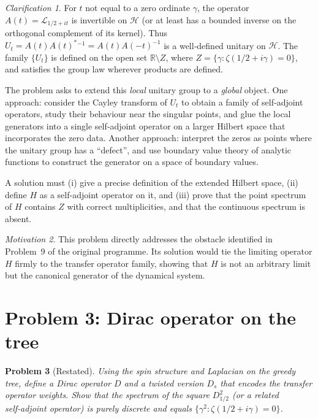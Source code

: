 \documentclass[11pt,a4paper]{article}
\newtheorem{problem}{Problem}[section]
\theoremstyle{remark}
\newtheorem{clarification}[problem]{Clarification}
\newtheorem{motivation}[problem]{Motivation}
\newcommand{\cL}{\mathcal{L}}
\newcommand{\cH}{\mathcal{H}}
\newcommand{\bbR}{\mathbb{R}}
\begin{document}
\begin{clarification}
For $t$ not equal to a zero ordinate $\gamma$, the operator $A(t)=\cL_{1/2+it}$ is invertible on $\cH$ (or at least has a bounded inverse on the orthogonal complement of its kernel). Thus $U_t = A(t)A(t)^*{}^{-1} = A(t)A(-t)^{-1}$ is a well‑defined unitary on $\cH$. The family $\{U_t\}$ is defined on the open set $\bbR\setminus Z$, where $Z=\{\gamma:\zeta(1/2+i\gamma)=0\}$, and satisfies the group law wherever products are defined.

The problem asks to extend this \emph{local} unitary group to a \emph{global} object. One approach: consider the Cayley transform of $U_t$ to obtain a family of self‑adjoint operators, study their behaviour near the singular points, and glue the local generators into a single self‑adjoint operator on a larger Hilbert space that incorporates the zero data. Another approach: interpret the zeros as points where the unitary group has a ``defect'', and use boundary value theory of analytic functions to construct the generator on a space of boundary values.

A solution must (i) give a precise definition of the extended Hilbert space, (ii) define $H$ as a self‑adjoint operator on it, and (iii) prove that the point spectrum of $H$ contains $Z$ with correct multiplicities, and that the continuous spectrum is absent.
\end{clarification}

\begin{motivation}
This problem directly addresses the obstacle identified in Problem~9 of the original programme. Its solution would tie the limiting operator $H$ firmly to the transfer operator family, showing that $H$ is not an arbitrary limit but the canonical generator of the dynamical system.
\end{motivation}

\section{Problem 3: Dirac operator on the tree}

\begin{problem}[Restated]
Using the spin structure and Laplacian on the greedy tree, define a Dirac operator $D$ and a twisted version $D_s$ that encodes the transfer operator weights. Show that the spectrum of the square $D_{1/2}^2$ (or a related self‑adjoint operator) is purely discrete and equals $\{\gamma^2:\zeta(1/2+i\gamma)=0\}$.
\end{problem}
\end{document}
